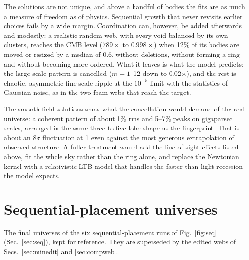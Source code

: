 \documentclass[aps,prd,twocolumn,nofootinbib,superscriptaddress,floatfix]{revtex4-2}
\newcommand{\fl}{\ensuremath{\times}}
\begin{document}
The solutions are not unique, and above a handful of bodies the fits are as much a measure of freedom as of physics. Sequential growth that never revisits earlier choices fails by a wide margin. Coordination can, however, be added afterwards and modestly: a realistic random web, with every void balanced by its own clusters, reaches the CMB level ($789\times$ to $0.998\times$) when 12\% of its bodies are moved or resized by a median of \SI{0.6}{\Gpc}, without deletions, without forming a ring and without becoming more ordered. What it leaves is what the model predicts: the large-scale pattern is cancelled ($m=1$--12 down to 0.02\fl), and the rest is chaotic, asymmetric fine-scale ripple at the $10^{-5}$ limit with the statistics of Gaussian noise, as in the two foam webs that reach the target.

The smooth-field solutions show what the cancellation would demand of the real universe: a coherent pattern of about 1\% rms and 5--7\% peaks on gigaparsec scales, arranged in the same three-to-five-lobe shape as the fingerprint. That is about an $8\sigma$ fluctuation at \SI{1}{\Gpc} even against the most generous extrapolation of observed structure. A fuller treatment would add the line-of-sight effects listed above, fit the whole sky rather than the ring alone, and replace the Newtonian kernel with a relativistic LTB model that handles the faster-than-light recession the model expects.




\raggedbottom
\appendix
\section{Sequential-placement universes}\label{app:seq}
The final universes of the six sequential-placement runs of Fig.~\ref{fig:seq} (Sec.~\ref{sec:seq}), kept for reference. They are superseded by the edited webs of Secs.~\ref{sec:minedit} and \ref{sec:compweb}.
\end{document}
